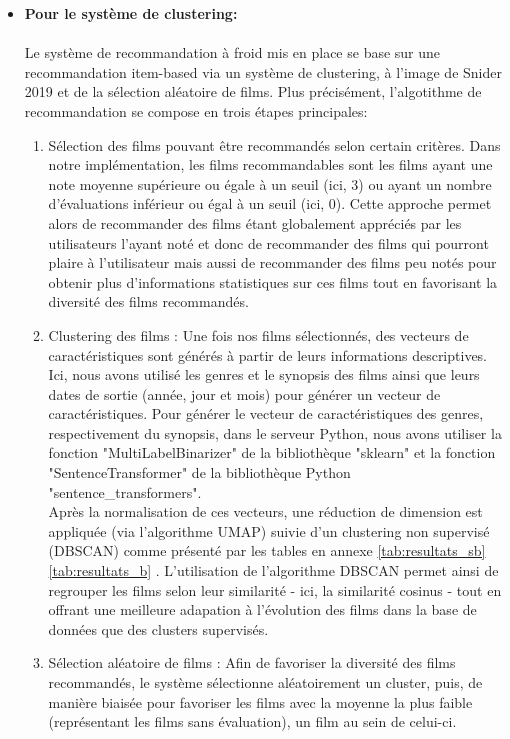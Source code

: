 \documentclass{article}
\begin{document}
\begin{itemize}
    \item \textbf{Pour le système de clustering:}\\
          $ $\\
          Le système de recommandation à froid mis en place se base sur une recommandation item-based via un système de clustering, à l'image de Snider 2019 \cite{snider_unsupervised} et de la sélection aléatoire de films.
          Plus précisément, l'algotithme de recommandation se compose en trois étapes principales:\\
          \begin{enumerate}
              \item Sélection des films pouvant être recommandés selon certain critères. Dans notre implémentation, les films recommandables sont les films ayant une note moyenne supérieure ou égale à un seuil (ici, 3) ou
                    ayant un nombre d’évaluations inférieur ou égal à un seuil (ici, 0). Cette approche permet alors de recommander des films étant globalement appréciés par les utilisateurs l'ayant noté et donc de recommander des films qui
                    pourront plaire à l'utilisateur mais aussi de recommander des films peu notés pour obtenir plus d'informations statistiques sur ces films tout en favorisant la diversité des films recommandés.
              \item Clustering des films : Une fois nos films sélectionnés, des vecteurs de caractéristiques sont générés à partir de leurs informations descriptives. Ici, nous avons utilisé les genres et le synopsis des films ainsi que leurs dates de
                    sortie (année, jour et mois) pour générer un vecteur de caractéristiques. Pour générer le vecteur de caractéristiques des genres, respectivement du synopsis, dans le serveur Python, nous avons utiliser la fonction "MultiLabelBinarizer" de
                    la bibliothèque "sklearn" et la fonction "SentenceTransformer" de la bibliothèque Python "sentence\_transformers".\\
                    Après la normalisation de ces vecteurs, une réduction de dimension est appliquée (via l’algorithme UMAP) suivie d’un clustering non supervisé (DBSCAN) comme présenté par les tables en annexe \ref{tab:resultats_sb} \ref{tab:resultats_b} . L'utilisation de l'algorithme DBSCAN permet ainsi de regrouper
                    les films selon leur similarité - ici, la similarité cosinus - tout en offrant une meilleure adapation à l'évolution des films dans la base de données que des clusters supervisés.
              \item Sélection aléatoire de films : Afin de favoriser la diversité des films recommandés, le système sélectionne aléatoirement un cluster, puis, de manière biaisée pour favoriser les films avec la moyenne la plus faible (représentant les films sans évaluation), un film au sein de celui-ci.

\end{enumerate}
\end{itemize}
\end{document}
